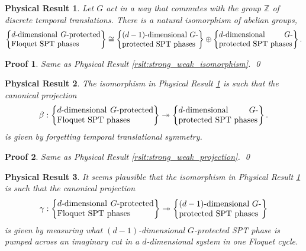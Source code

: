 \documentclass[sort&compress]{elsarticle}
\theoremstyle{theoremstyle}
\theoremstyle{framedtheoremstyle}
\newtheorem{rslt}{Physical Result}
\theoremstyle{definitionstyle}
\theoremstyle{definitionstyle}
\theoremstyle{definitionstyle}
\theoremstyle{definitionstyle}
\theoremstyle{nameddefinitionstyle}
\theoremstyle{framednameddefinitionstyle}
\theoremstyle{proofstyle}
\newtheorem{pf}{Proof}
\theoremstyle{definitionstyle}
\newcommand{\onto}{\twoheadrightarrow}
\newcommand{\ZZZ}{\mathbb{Z}}
\newcommand{\isomorphic}{\cong}
\newcommand{\braces}[1]{\left\{ #1 \right\}}
\begin{document}

\begin{framed}\begin{rslt}\label{rslt:Floquet_isomorphism}
Let $G$ act in a way that commutes with the group $\ZZZ$ of discrete temporal translations. There is a natural isomorphism of abelian groups,
\begin{eqnarray}
\braces{\parbox{4.1cm}{$d$-dimensional $G$-protected Floquet SPT phases}}
\isomorphic
\braces{\parbox{3.5cm}{$(d-1)$-dimensional $G$-protected SPT phases}}
\oplus
\braces{\parbox{3.4cm}{$d$-dimensional $G$-protected SPT phases}}.\label{pumping_Floquet_eigenstates_classification_Floquet_SPT_phases_isomorphism}
\end{eqnarray}
\end{rslt}\end{framed}

\begin{pf}
Same as Physical Result \ref{rslt:strong_weak_isomorphism}.
\qed\end{pf}

\begin{framed}\begin{rslt}\label{rslt:Floquet_projection}
The isomorphism in Physical Result \ref{rslt:Floquet_isomorphism} is such that the canonical projection
\begin{eqnarray}
\beta: \braces{\parbox{4.1cm}{$d$-dimensional $G$-protected Floquet SPT phases}}
\onto
\braces{\parbox{3.4cm}{$d$-dimensional $G$-protected SPT phases}}.
\end{eqnarray}
is given by forgetting temporal translational symmetry.
\end{rslt}\end{framed}

\begin{pf}
Same as Physical Result \ref{rslt:strong_weak_projection}.
\qed\end{pf}

\begin{framed}\begin{rslt}\label{rslt:Floquet_projection_2}
It seems plausible that the isomorphism in Physical Result \ref{rslt:Floquet_isomorphism} is such that the canonical projection
\begin{eqnarray}
\gamma: 
\braces{\parbox{4.1cm}{$d$-dimensional $G$-protected Floquet SPT phases}}
\onto
\braces{\parbox{3.5cm}{$(d-1)$-dimensional $G$-protected SPT phases}}
\end{eqnarray}
is given by measuring what $(d-1)$-dimensional $G$-protected SPT phase is pumped across an imaginary cut in a $d$-dimensional system in one Floquet cycle.
\end{rslt}\end{framed}
\end{document}
